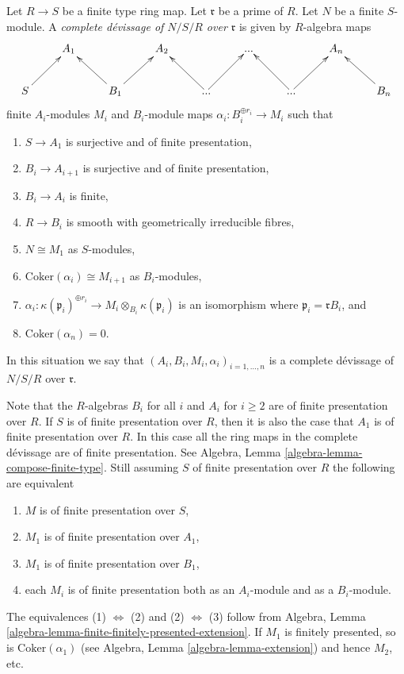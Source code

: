 \begin{definition}
\label{definition-complete-devissage-algebra}
Let $R \to S$ be a finite type ring map.
Let $\mathfrak r$ be a prime of $R$.
Let $N$ be a finite $S$-module.
A {\it complete d\'evissage of $N/S/R$ over $\mathfrak r$}
is given by $R$-algebra maps
$$
\xymatrix{
& A_1 & & A_2 & & ... & & A_n \\
S \ar[ru] & & B_1 \ar[lu] \ar[ru] & & ... \ar[lu] \ar[ru] & &
... \ar[lu] \ar[ru] & & B_n \ar[lu]
}
$$
finite $A_i$-modules $M_i$ and $B_i$-module maps
$\alpha_i : B_i^{\oplus r_i} \to M_i$ such that
\begin{enumerate}
\item $S \to A_1$ is surjective and of finite presentation,
\item $B_i \to A_{i + 1}$ is surjective and of finite presentation,
\item $B_i \to A_i$ is finite,
\item $R \to B_i$ is smooth with geometrically irreducible fibres,
\item $N \cong M_1$ as $S$-modules,
\item $\text{Coker}(\alpha_i) \cong M_{i + 1}$ as $B_i$-modules,
\item $\alpha_i : \kappa(\mathfrak p_i)^{\oplus r_i}
\to M_i \otimes_{B_i} \kappa(\mathfrak p_i)$ is an isomorphism
where $\mathfrak p_i = \mathfrak rB_i$, and
\item $\text{Coker}(\alpha_n) = 0$.
\end{enumerate}
In this situation we say that
$(A_i, B_i, M_i, \alpha_i)_{i = 1, \ldots, n}$
is a complete d\'evissage of $N/S/R$ over $\mathfrak r$. 
\end{definition}

\begin{remark}
\label{remark-finite-presentation}
Note that the $R$-algebras $B_i$ for all $i$ and $A_i$ for $i \geq 2$
are of finite presentation over $R$. If $S$ is of finite presentation over
$R$, then it is also the case that $A_1$ is of finite presentation over
$R$. In this case all the ring maps in the complete d\'evissage are of
finite presentation. See
Algebra, Lemma \ref{algebra-lemma-compose-finite-type}.
Still assuming $S$ of finite presentation over $R$
the following are equivalent
\begin{enumerate}
\item $M$ is of finite presentation over $S$,
\item $M_1$ is of finite presentation over $A_1$,
\item $M_1$ is of finite presentation over $B_1$,
\item each $M_i$ is of finite presentation both as an $A_i$-module
and as a $B_i$-module.
\end{enumerate}
The equivalences (1) $\Leftrightarrow$ (2) and (2) $\Leftrightarrow$ (3)
follow from
Algebra, Lemma \ref{algebra-lemma-finite-finitely-presented-extension}.
If $M_1$ is finitely presented, so is $\text{Coker}(\alpha_1)$ (see
Algebra, Lemma \ref{algebra-lemma-extension})
and hence $M_2$, etc.
\end{remark}

